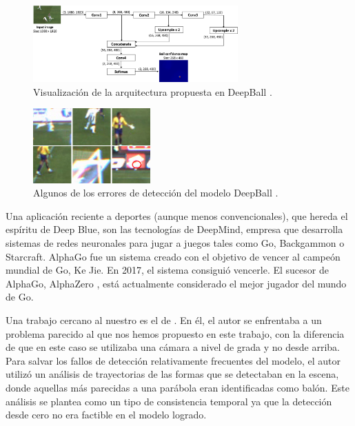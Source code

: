 \begin{figure}
    \centering
    \includegraphics[width=0.7\textwidth]{images/deepball}
    \caption{Visualización de la arquitectura propuesta en DeepBall \cite{art:DeepBall}.}
    \label{fig:deepball}
\end{figure}


\begin{figure}
    \centering
    \includegraphics[width=0.4\textwidth]{images/errorDeepball.png}
    \caption{Algunos de los errores de detección del modelo DeepBall \cite{art:DeepBall}.}
    \label{fig:deepballerror}
\end{figure}

Una aplicación reciente a deportes (aunque menos convencionales), que hereda el espíritu de Deep Blue, son las tecnologías de DeepMind, empresa que desarrolla sistemas de redes neuronales para jugar a juegos tales como Go, Backgammon o Starcraft. AlphaGo fue un sistema creado con el objetivo de vencer al campeón mundial de Go, Ke Jie. En 2017, el sistema consiguió vencerle. El sucesor de AlphaGo, AlphaZero \cite{AlphaZero}, está actualmente considerado el mejor jugador del mundo de Go.

Una trabajo cercano al nuestro es el de \citet{volleyDeep}. En él, el autor se enfrentaba a un problema parecido al que nos hemos propuesto en este trabajo, con la diferencia de que en este caso se utilizaba una cámara a nivel de grada y no desde arriba. Para salvar los fallos de detección relativamente frecuentes del modelo, el autor utilizó un análisis de trayectorias de las formas que se detectaban en la escena, donde aquellas más parecidas a una parábola eran identificadas como balón. Este análisis se plantea como un tipo de consistencia temporal ya que la detección desde cero no era factible en el modelo logrado.

\newpage